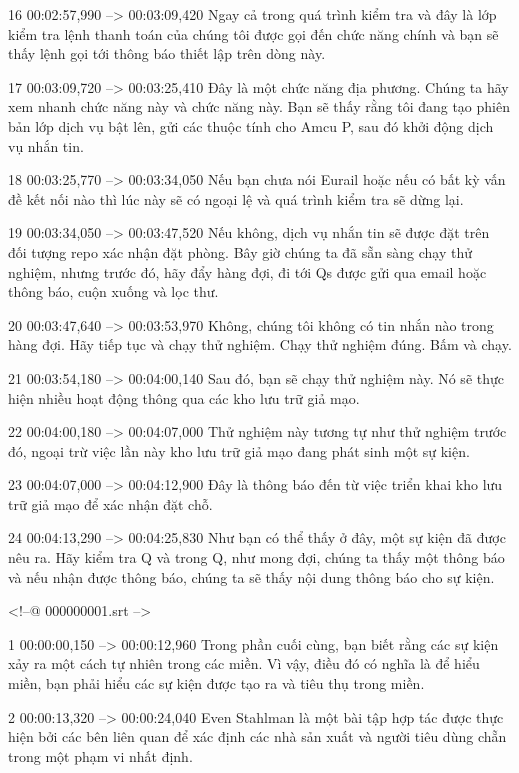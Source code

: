 16
00:02:57,990 --> 00:03:09,420
Ngay cả trong quá trình kiểm tra và đây là lớp kiểm tra lệnh thanh toán của chúng tôi được gọi đến chức năng chính và bạn sẽ thấy lệnh gọi tới thông báo thiết lập trên dòng này.

17
00:03:09,720 --> 00:03:25,410
Đây là một chức năng địa phương.  Chúng ta hãy xem nhanh chức năng này và chức năng này.  Bạn sẽ thấy rằng tôi đang tạo phiên bản lớp dịch vụ bật lên, gửi các thuộc tính cho Amcu P, sau đó khởi động dịch vụ nhắn tin.

18
00:03:25,770 --> 00:03:34,050
Nếu bạn chưa nói Eurail hoặc nếu có bất kỳ vấn đề kết nối nào thì lúc này sẽ có ngoại lệ và quá trình kiểm tra sẽ dừng lại.

19
00:03:34,050 --> 00:03:47,520
Nếu không, dịch vụ nhắn tin sẽ được đặt trên đối tượng repo xác nhận đặt phòng.  Bây giờ chúng ta đã sẵn sàng chạy thử nghiệm, nhưng trước đó, hãy đẩy hàng đợi, đi tới Qs được gửi qua email hoặc thông báo, cuộn xuống và lọc thư.

20
00:03:47,640 --> 00:03:53,970
Không, chúng tôi không có tin nhắn nào trong hàng đợi.  Hãy tiếp tục và chạy thử nghiệm.  Chạy thử nghiệm đúng.  Bấm và chạy.

21
00:03:54,180 --> 00:04:00,140
Sau đó, bạn sẽ chạy thử nghiệm này.  Nó sẽ thực hiện nhiều hoạt động thông qua các kho lưu trữ giả mạo.

22
00:04:00,180 --> 00:04:07,000
Thử nghiệm này tương tự như thử nghiệm trước đó, ngoại trừ việc lần này kho lưu trữ giả mạo đang phát sinh một sự kiện.

23
00:04:07,000 --> 00:04:12,900
Đây là thông báo đến từ việc triển khai kho lưu trữ giả mạo để xác nhận đặt chỗ.

24
00:04:13,290 --> 00:04:25,830
Như bạn có thể thấy ở đây, một sự kiện đã được nêu ra.  Hãy kiểm tra Q và trong Q, như mong đợi, chúng ta thấy một thông báo và nếu nhận được thông báo, chúng ta sẽ thấy nội dung thông báo cho sự kiện.

<!--@ 000000001.srt -->

1
00:00:00,150 --> 00:00:12,960
Trong phần cuối cùng, bạn biết rằng các sự kiện xảy ra một cách tự nhiên trong các miền.  Vì vậy, điều đó có nghĩa là để hiểu miền, bạn phải hiểu các sự kiện được tạo ra và tiêu thụ trong miền.

2
00:00:13,320 --> 00:00:24,040
Even Stahlman là một bài tập hợp tác được thực hiện bởi các bên liên quan để xác định các nhà sản xuất và người tiêu dùng chẵn trong một phạm vi nhất định.

